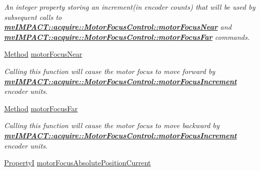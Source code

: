 \begin{DoxyCompactItemize}
\begin{DoxyCompactList}\small\item\em An integer property storing an increment(in encoder counts) that will be used by subsequent calls to {\bfseries \hyperlink{classmv_i_m_p_a_c_t_1_1acquire_1_1_motor_focus_control_a2e540b8e1e47709808be060d21ae20d6}{mv\+I\+M\+P\+A\+C\+T\+::acquire\+::\+Motor\+Focus\+Control\+::motor\+Focus\+Near}} and {\bfseries \hyperlink{classmv_i_m_p_a_c_t_1_1acquire_1_1_motor_focus_control_a263ccaf6b3608365439c9feee08d36be}{mv\+I\+M\+P\+A\+C\+T\+::acquire\+::\+Motor\+Focus\+Control\+::motor\+Focus\+Far}} commands. \end{DoxyCompactList}\item 
\hypertarget{classmv_i_m_p_a_c_t_1_1acquire_1_1_motor_focus_control_a2e540b8e1e47709808be060d21ae20d6}{\hyperlink{classmv_i_m_p_a_c_t_1_1acquire_1_1_method}{Method} \hyperlink{classmv_i_m_p_a_c_t_1_1acquire_1_1_motor_focus_control_a2e540b8e1e47709808be060d21ae20d6}{motor\+Focus\+Near}}\label{classmv_i_m_p_a_c_t_1_1acquire_1_1_motor_focus_control_a2e540b8e1e47709808be060d21ae20d6}

\begin{DoxyCompactList}\small\item\em Calling this function will cause the motor focus to move forward by {\bfseries \hyperlink{classmv_i_m_p_a_c_t_1_1acquire_1_1_motor_focus_control_ab7b8de1875dfaf3ee35e2e9edc5b4284}{mv\+I\+M\+P\+A\+C\+T\+::acquire\+::\+Motor\+Focus\+Control\+::motor\+Focus\+Increment}} encoder units. \end{DoxyCompactList}\item 
\hypertarget{classmv_i_m_p_a_c_t_1_1acquire_1_1_motor_focus_control_a263ccaf6b3608365439c9feee08d36be}{\hyperlink{classmv_i_m_p_a_c_t_1_1acquire_1_1_method}{Method} \hyperlink{classmv_i_m_p_a_c_t_1_1acquire_1_1_motor_focus_control_a263ccaf6b3608365439c9feee08d36be}{motor\+Focus\+Far}}\label{classmv_i_m_p_a_c_t_1_1acquire_1_1_motor_focus_control_a263ccaf6b3608365439c9feee08d36be}

\begin{DoxyCompactList}\small\item\em Calling this function will cause the motor focus to move backward by {\bfseries \hyperlink{classmv_i_m_p_a_c_t_1_1acquire_1_1_motor_focus_control_ab7b8de1875dfaf3ee35e2e9edc5b4284}{mv\+I\+M\+P\+A\+C\+T\+::acquire\+::\+Motor\+Focus\+Control\+::motor\+Focus\+Increment}} encoder units. \end{DoxyCompactList}\item 
\hypertarget{classmv_i_m_p_a_c_t_1_1acquire_1_1_motor_focus_control_abaaf6edab0175dc91920aa5a08ae842d}{\hyperlink{group___common_interface_ga12d5e434238ca242a1ba4c6c3ea45780}{Property\+I} \hyperlink{classmv_i_m_p_a_c_t_1_1acquire_1_1_motor_focus_control_abaaf6edab0175dc91920aa5a08ae842d}{motor\+Focus\+Absolute\+Position\+Current}}\label{classmv_i_m_p_a_c_t_1_1acquire_1_1_motor_focus_control_abaaf6edab0175dc91920aa5a08ae842d}


\end{DoxyCompactItemize}
